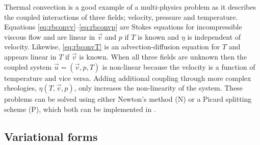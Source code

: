 Thermal convection is a good example of a multi-physics 
problem as it describes the coupled interactions of three fields;
velocity, pressure and temperature. Equations
\eqref{eq:rbconvv}--\eqref{eq:rbconvp} are  Stokes equations for incompressible viscous flow and are linear in $\vec{v}$ and $p$ if $T$ is
known and $\eta$ is independent of velocity.  Likewise,
\eqref{eq:rbconvT} is an advection-diffusion equation for $T$ and
appears linear in $T$ if $\vec{v}$ is known.   When all three fields are unknown then the coupled system $\vec{u}=\left(\vec{v}, p,
T\right)$ is non-linear because the velocity is a function of temperature and vice versa.  Adding additional coupling through more
complex rheologies, $\eta\left(T,\vec{v},p\right)$, only increases the
non-linearity of the system. These problems can be solved using either
Newton's method (N) or a Picard splitting scheme (P), which both can
be implemented in \TF{}.


\subsection{Variational forms}
\label{sec:variational-forms}

